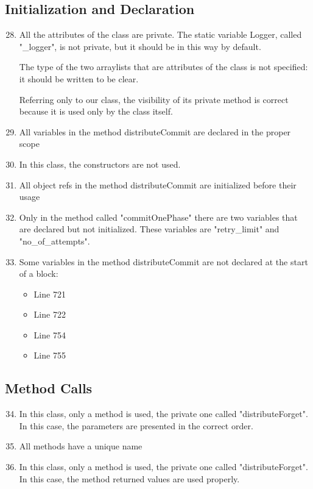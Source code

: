 \subsection{Initialization and Declaration}
\begin{enumerate}
	\setcounter{enumi}{27}
	\item All the attributes of the class are private. The static variable Logger, called "\_logger", is not private, but it should be in this way by default. 
	
    The type of the two arraylists that are attributes of the class is not specified: it should be written to be clear.
    
    Referring only to our class, the visibility of its private method is correct because it is used only by the class itself. 

	\item All variables in the method distributeCommit are declared in the proper scope
	\item In this class, the constructors are not used.
	\item All object refs in the method distributeCommit are initialized before their usage
	\item Only in the method called "commitOnePhase" there are two variables that are declared but not initialized. These variables are "retry\_limit" and "no\_of\_attempts".
	\item Some variables in the method distributeCommit are not declared at the start of a block:
	\begin{itemize}
		\item Line 721
		\item Line 722
		\item Line 754
		\item Line 755
	\end{itemize}
\end{enumerate}
\subsection{Method Calls}
\begin{enumerate}
	\setcounter{enumi}{33}
	\item In this class, only a method is used, the private one called "distributeForget". In this case, the parameters are presented in the correct order.
	\item All methods have a unique name
	\item In this class, only a method is used, the private one called "distributeForget". In this case, the method returned values are used properly.
\end{enumerate}
